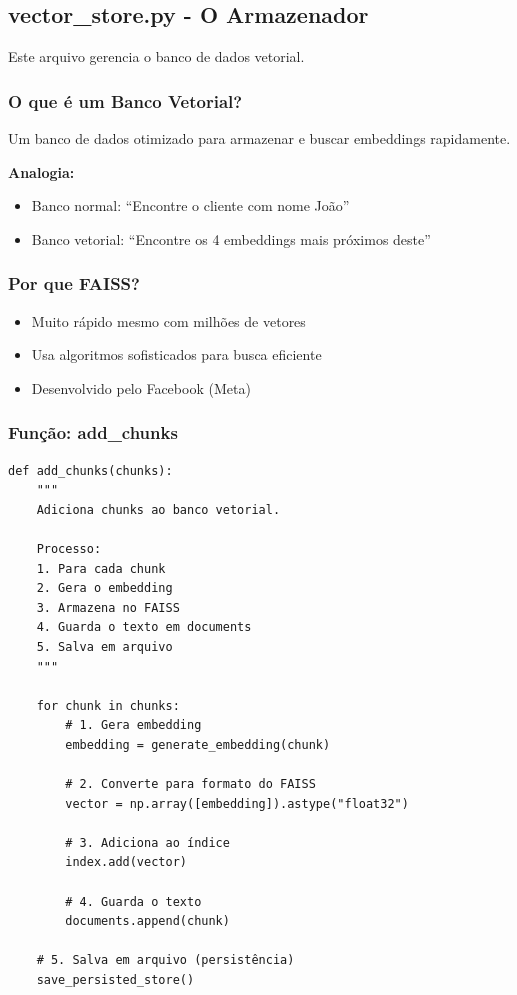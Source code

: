 \documentclass[12pt,a4paper]{article}
\begin{document}
\subsection{vector\_store.py - O Armazenador}

Este arquivo gerencia o banco de dados vetorial.

\subsubsection{O que é um Banco Vetorial?}

Um banco de dados otimizado para armazenar e buscar embeddings rapidamente.

\textbf{Analogia:}
\begin{itemize}
    \item Banco normal: ``Encontre o cliente com nome João''
    \item Banco vetorial: ``Encontre os 4 embeddings mais próximos deste''
\end{itemize}

\subsubsection{Por que FAISS?}

\begin{itemize}
    \item Muito rápido mesmo com milhões de vetores
    \item Usa algoritmos sofisticados para busca eficiente
    \item Desenvolvido pelo Facebook (Meta)
\end{itemize}

\subsubsection{Função: add\_chunks}

\begin{lstlisting}
def add_chunks(chunks):
    """
    Adiciona chunks ao banco vetorial.
    
    Processo:
    1. Para cada chunk
    2. Gera o embedding
    3. Armazena no FAISS
    4. Guarda o texto em documents
    5. Salva em arquivo
    """
    
    for chunk in chunks:
        # 1. Gera embedding
        embedding = generate_embedding(chunk)
        
        # 2. Converte para formato do FAISS
        vector = np.array([embedding]).astype("float32")
        
        # 3. Adiciona ao índice
        index.add(vector)
        
        # 4. Guarda o texto
        documents.append(chunk)
    
    # 5. Salva em arquivo (persistência)
    save_persisted_store()
\end{lstlisting}
\end{document}
